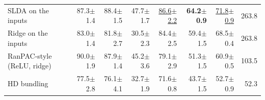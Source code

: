 \begin{tabular}{lrrrrrrr}
SLDA on the inputs & 87.3{\tiny$\pm$1.4} & 88.4{\tiny$\pm$1.5} & 47.7{\tiny$\pm$1.7} & \underline{86.6{\tiny$\pm$2.2}} & \textbf{64.2{\tiny$\pm$0.9}} & \underline{71.8{\tiny$\pm$0.9}} & 263.8 \\
Ridge on the inputs & 83.0{\tiny$\pm$1.4} & 81.8{\tiny$\pm$2.7} & 30.5{\tiny$\pm$2.3} & 84.4{\tiny$\pm$2.5} & 59.4{\tiny$\pm$1.5} & 68.5{\tiny$\pm$0.4} & 263.8 \\
RanPAC-style (ReLU, ridge) & 90.0{\tiny$\pm$1.9} & 87.9{\tiny$\pm$1.4} & 45.2{\tiny$\pm$3.6} & 79.1{\tiny$\pm$2.9} & 51.3{\tiny$\pm$1.5} & 60.9{\tiny$\pm$0.5} & 103.5 \\
HD bundling & 77.5{\tiny$\pm$2.8} & 76.1{\tiny$\pm$4.1} & 32.7{\tiny$\pm$1.9} & 71.6{\tiny$\pm$0.8} & 43.7{\tiny$\pm$1.5} & 52.7{\tiny$\pm$0.9} & 52.3 \\
\bottomrule
\end{tabular}
